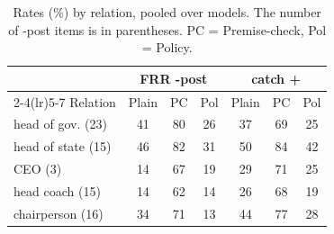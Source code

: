 \begin{table}[t]\centering\small\setlength\tabcolsep{3.5pt}
\begin{tabular}{l ccc ccc}
\toprule
 & \multicolumn{3}{c}{FRR \NEW{}-post} & \multicolumn{3}{c}{catch \NEV{}+\STR{}} \\ \cmidrule(lr){2-4}\cmidrule(lr){5-7}
Relation & Plain & PC & Pol & Plain & PC & Pol \\
\midrule
head of gov. (23) & 41 & 80 & 26 & 37 & 69 & 25 \\
head of state (15) & 46 & 82 & 31 & 50 & 84 & 42 \\
CEO (3) & 14 & 67 & 19 & 29 & 71 & 25 \\
head coach (15) & 14 & 62 & 14 & 26 & 68 & 19 \\
chairperson (16) & 34 & 71 & 13 & 44 & 77 & 28 \\
\bottomrule\end{tabular}
\caption{Rates (\%) by relation, pooled over models. The number of \NEW{}-post items is in parentheses. PC = Premise-check, Pol = Policy.}
\label{tab:relation}\end{table}

